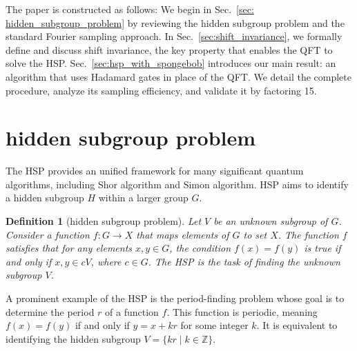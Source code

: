 \documentclass[aps,reprint,showpacs,tightenlines, twocolumn]{revtex4-2}
\newtheorem{definition}{Definition}
\newcommand{\ZZ}{\mathbb{Z}}
\begin{document}

The paper is constructed as follows: We begin in Sec.~\ref{sec: hidden_subgroup_problem} by reviewing the hidden subgroup problem and the standard Fourier sampling approach. In Sec.~\ref{sec:shift_invariance}, we formally define and discuss shift invariance, the key property that enables the QFT to solve the HSP. Sec.~\ref{sec:hsp_with_spongebob} introduces our main result: an algorithm that uses Hadamard gates in place of the QFT. We detail the complete procedure, analyze its sampling efficiency, and validate it by factoring 15. 


\section{hidden subgroup problem}

The HSP provides an unified framework for many significant quantum algorithms, including Shor algorithm and Simon algorithm. HSP aims to identify a hidden subgroup $H$ within a larger group $G$.
\begin{definition}[hidden subgroup problem]
    Let $V$ be an unknown subgroup of $G$. Consider a function $f: G \to X$ that maps elements of $G$ to set $X$. The function $f$ satisfies that for any elements $x,y\in G$, the condition $f(x)=f(y)$ is true if and only if $x, y \in cV$, where $c\in G$. The HSP is the task of finding the unknown subgroup $V$.
\end{definition}

A prominent example of the HSP is the period-finding problem whose goal is to determine the period $r$ of a function $f$. This function is periodic, meaning $f(x) = f(y)$ if and only if $y = x + kr$ for some integer $k$. It is equivalent to identifying the hidden subgroup $V = \{ kr \mid k \in \ZZ \}$.
\end{document}
